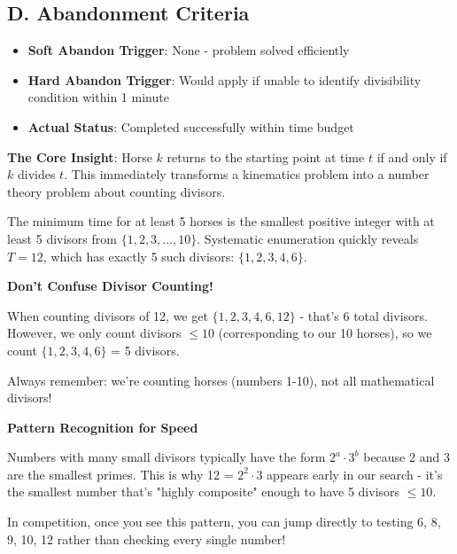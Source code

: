 \documentclass[]{article}
\begin{document}
\begin{competitionbox}
\subsection*{D. Abandonment Criteria}
\begin{itemize}[leftmargin=*]
    \item \textbf{Soft Abandon Trigger}: None - problem solved efficiently
    \item \textbf{Hard Abandon Trigger}: Would apply if unable to identify divisibility condition within 1 minute
    \item \textbf{Actual Status}: Completed successfully within time budget
\end{itemize}
\end{competitionbox}

\begin{keyinsightbox}
\textbf{The Core Insight}: Horse $k$ returns to the starting point at time $t$ if and only if $k$ divides $t$. This immediately transforms a kinematics problem into a number theory problem about counting divisors.

The minimum time for at least 5 horses is the smallest positive integer with at least 5 divisors from $\{1, 2, 3, \ldots, 10\}$. Systematic enumeration quickly reveals $T = 12$, which has exactly 5 such divisors: $\{1, 2, 3, 4, 6\}$.
\end{keyinsightbox}

\begin{warningbox}
\textbf{Don't Confuse Divisor Counting!}

When counting divisors of 12, we get $\{1, 2, 3, 4, 6, 12\}$ - that's 6 total divisors. However, we only count divisors $\leq 10$ (corresponding to our 10 horses), so we count $\{1, 2, 3, 4, 6\}$ = 5 divisors.

Always remember: we're counting horses (numbers 1-10), not all mathematical divisors!
\end{warningbox}

\begin{tipbox}
\textbf{Pattern Recognition for Speed}

Numbers with many small divisors typically have the form $2^a \cdot 3^b$ because 2 and 3 are the smallest primes. This is why 12 = $2^2 \cdot 3$ appears early in our search - it's the smallest number that's "highly composite" enough to have 5 divisors $\leq 10$.

In competition, once you see this pattern, you can jump directly to testing 6, 8, 9, 10, 12 rather than checking every single number!
\end{tipbox}
\end{document}
